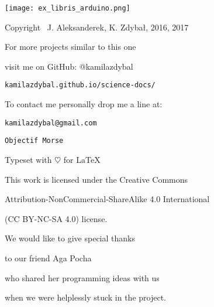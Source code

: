 \documentclass[12pt]{report}
\begin{document}

\thispagestyle{empty}
\begin{center}
    
\vspace*{3cm}

\texttt{[image: ex\_libris\_arduino.png]}

\vspace*{2cm}

Copyright \textcopyright \, J. Aleksanderek, K. Zdybał, 2016, 2017

For more projects similar to this one

visit me on GitHub: @kamilazdybal

\verb|kamilazdybal.github.io/science-docs/|

To contact me personally drop me a line at:

\verb|kamilazdybal@gmail.com|

\vspace*{2cm}

\verb|Objectif Morse|

Typeset with $\heartsuit$ for \LaTeX

\vspace*{1.8cm}

\noindent This work is licensed under the Creative Commons

Attribution-NonCommercial-ShareAlike 4.0 International 

(CC BY-NC-SA
4.0) license.

\end{center}
\newpage

\setlength{\parskip}{1em}
\renewcommand{\baselinestretch}{1.0}

\thispagestyle{empty}
\begin{center}
    
\vspace*{2.5cm}

{\selectfont
We would like to give special thanks

to our friend Aga Pocha

who shared her programming ideas with us

when we were helplessly stuck in the project.

}
\vspace*{2cm}

\end{center}

\setlength{\parskip}{0em}
\renewcommand{\baselinestretch}{0.0}
\end{document}
